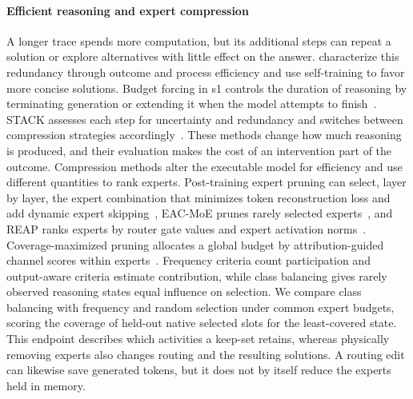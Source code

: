 \paragraph{Efficient reasoning and expert compression}
A longer trace spends more computation, but its additional steps can repeat a solution or explore alternatives with little effect on the answer.
%
\citet{chen2025overthinking} characterize this redundancy through outcome and process efficiency and use self-training to favor more concise solutions.
%
Budget forcing in s1 controls the duration of reasoning by terminating generation or extending it when the model attempts to finish~\citep{muennighoff2025s1}.
%
STACK assesses each step for uncertainty and redundancy and switches between compression strategies accordingly~\citep{sui2026think}.
%
These methods change how much reasoning is produced, and their evaluation makes the cost of an intervention part of the outcome.
%
Compression methods alter the executable model for efficiency and use different quantities to rank experts.
%
Post-training expert pruning can select, layer by layer, the expert combination that minimizes token reconstruction loss and add dynamic expert skipping~\citep{lu2024naee}, EAC-MoE prunes rarely selected experts~\citep{chen2025eac}, and REAP ranks experts by router gate values and expert activation norms~\citep{lasby2026reap}.
%
Coverage-maximized pruning allocates a global budget by attribution-guided channel scores within experts~\citep{ding2026coverage}.
%
Frequency criteria count participation and output-aware criteria estimate contribution, while class balancing gives rarely observed reasoning states equal influence on selection.
%
We compare class balancing with frequency and random selection under common expert budgets, scoring the coverage of held-out native selected slots for the least-covered state.
%
This endpoint describes which activities a keep-set retains, whereas physically removing experts also changes routing and the resulting solutions.
%
A routing edit can likewise save generated tokens, but it does not by itself reduce the experts held in memory.
%
